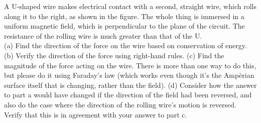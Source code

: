 A U-shaped wire makes electrical contact with a second, straight wire, which rolls along it to the
right,
as shown in the figure. The whole thing is immersed in a uniform magnetic field, which is
perpendicular to the plane of the circuit. The resistance of the rolling wire is much
greater than that of the U.\\
(a) Find the direction of the force on the wire based on conservation of energy.\hwendpart
(b) Verify the direction of the force using right-hand rules.\hwendpart
(c) Find the magnitude of the force acting on the wire.
 There is more than one way to do this, but please
do it using Faraday's law (which works even though it's the
Amp\`{e}rian surface itself that is changing, rather than the field).\answercheck\hwendpart
(d) Consider how the answer to part a would have changed if the direction of the field had been
reversed, and also do the case where the direction of the rolling wire's motion is reversed.
Verify that this is in agreement with your answer to part c.
